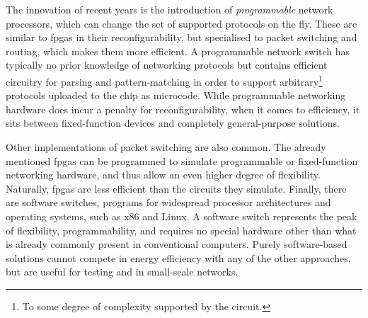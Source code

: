 The innovation of recent years is the introduction of \emph{programmable}
network processors, which can change the set of supported protocols on the fly.
These are similar to \acrshort{fpga}s in their reconfigurability, but
specialised to packet switching and routing, which makes them more efficient. A
programmable network switch has typically no prior knowledge of networking
protocols but contains efficient circuitry for parsing and pattern-matching in
order to support arbitrary\footnote{To some degree of complexity supported by
the circuit.} protocols uploaded to the chip as microcode. While programmable
networking hardware does incur a penalty for reconfigurability, when it comes to
efficiency, it sits between fixed-function devices and completely general-purpose
solutions.

Other implementations of packet switching are also common. The already mentioned
\acrlong{fpga}s can be programmed to simulate programmable or fixed-function
networking hardware, and thus allow an even higher degree of flexibility.
Naturally, \acrshort{fpga}s are less efficient than the circuits they simulate.
Finally, there are software switches, programs for widespread processor
architectures and operating systems, such as x86 and Linux. A software switch
represents the peak of flexibility, programmability, and requires no special
hardware other than what is already commonly present in conventional computers.
Purely software-based solutions cannot compete in energy efficiency with any of
the other approaches, but are useful for testing and in small-scale networks.

